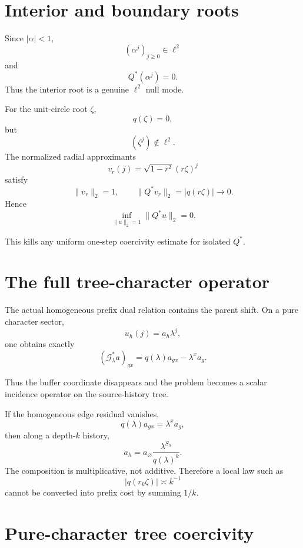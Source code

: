 \documentclass[11pt,a4paper]{article}
\newcommand{\Gcal}{\mathcal G}
\begin{document}
\section{Interior and boundary roots}

Since \(|\alpha|<1\),
\[
(\alpha^j)_{j\ge0}\in\ell^2
\]
and
\[
Q^*(\alpha^j)=0.
\]
Thus the interior root is a genuine \(\ell^2\) null mode.

For the unit-circle root \(\zeta\),
\[
q(\zeta)=0,
\]
but
\[
(\zeta^j)\notin\ell^2.
\]
The normalized radial approximants
\[
v_r(j)=\sqrt{1-r^2}(r\zeta)^j
\]
satisfy
\[
\|v_r\|_2=1,
\qquad
\|Q^*v_r\|_2
=
|q(r\zeta)|
\longrightarrow0.
\]
Hence
\[
\boxed{
\inf_{\|u\|_2=1}\|Q^*u\|_2=0.
}
\tag{19}
\]

This kills any uniform one-step coercivity estimate for isolated \(Q^*\).

\section{The full tree-character operator}

The actual homogeneous prefix dual relation contains the parent shift.
On a pure character sector,
\[
u_h(j)=a_h\lambda^j,
\]
one obtains exactly
\begin{equation}
\boxed{
(\Gcal_\lambda^*a)_{gx}
=
q(\lambda)a_{gx}
-
\lambda^xa_g.
}
\tag{20}
\end{equation}

Thus the buffer coordinate disappears and the problem becomes a scalar
incidence operator on the source-history tree.

If the homogeneous edge residual vanishes,
\[
q(\lambda)a_{gx}
=
\lambda^xa_g,
\]
then along a depth-\(k\) history,
\[
\boxed{
a_h
=
a_\varnothing
\frac{\lambda^{S_h}}{q(\lambda)^k}.
}
\tag{21}
\]
The composition is multiplicative, not additive.
Therefore a local law such as
\[
|q(r_k\zeta)|\asymp k^{-1}
\]
cannot be converted into prefix cost by summing \(1/k\).

\section{Pure-character tree coercivity}
\end{document}
